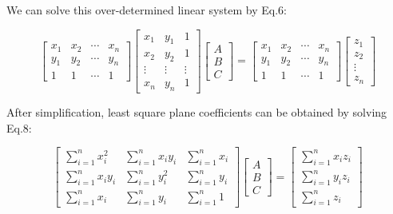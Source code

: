 We can solve this over-determined linear system by Eq.6:
\begin{small}	%
\begin{equation}
\begin{bmatrix}
x_{1} & x_{2} & \cdots & x_{n}	\\
y_{1} & y_{2} & \cdots & y_{n}	\\
1 & 1 & \cdots & 1
\end{bmatrix}
\begin{bmatrix}
x_{1} & y_{1} & 1	\\
x_{2} & y_{2} & 1	\\
\vdots & \vdots & \vdots		\\
x_{n} & y_{n} & 1
\end{bmatrix}
\begin{bmatrix}
A	\\
B	\\
C
\end{bmatrix}
=
\begin{bmatrix}
x_{1} & x_{2} & \cdots & x_{n}	\\
y_{1} & y_{2} & \cdots & y_{n}	\\
1 & 1 & \cdots & 1
\end{bmatrix}
\begin{bmatrix}
z_{1}	\\
z_{2}	\\
\vdots		\\
z_{n}
\end{bmatrix}
\end{equation}
\end{small}

After simplification, least square plane coefficients can be obtained by solving Eq.8:
\begin{small}	%
\begin{equation}
\begin{bmatrix}
\sum_{i=1}^{n}{x_{i}^2} 	& \sum_{i=1}^{n}{x_{i}y_{i}}	& \sum_{i=1}^{n}{x_{i}}	\\
\sum_{i=1}^{n}{x_{i}y_{i}} 	& \sum_{i=1}^{n}{y_{i}^2}		& \sum_{i=1}^{n}{y_{i}}	\\
\sum_{i=1}^{n}{x_{i}} 		& \sum_{i=1}^{n}{y_{i}}			& \sum_{i=1}^{n}{1}	
\end{bmatrix}
\begin{bmatrix}
A	\\
B	\\
C
\end{bmatrix}
=
\begin{bmatrix}
\sum_{i=1}^{n}{x_{i}z_{i}}	\\
\sum_{i=1}^{n}{y_{i}z_{i}}	\\
\sum_{i=1}^{n}{z_{i}}
\end{bmatrix}
\end{equation}
\end{small}

